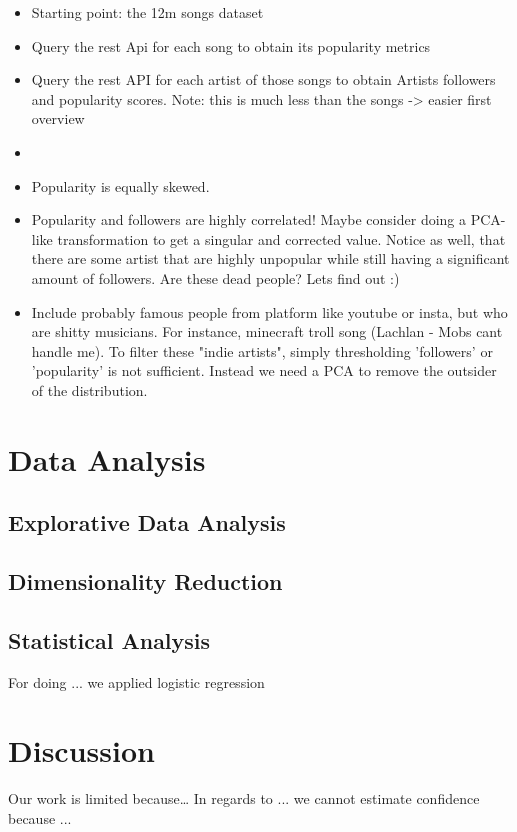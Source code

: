\documentclass{article}
\begin{document}
\begin{itemize}
  \item Starting point: the 12m songs dataset
  \item Query the rest Api for each song to obtain its popularity metrics
  \item Query the rest API for each artist of those songs to obtain Artists followers and popularity scores. Note: this is much less than the songs -> easier first overview
  \item 
  \item Popularity is equally skewed.
  \item Popularity and followers are highly correlated! Maybe consider doing a PCA-like transformation to get a singular and corrected value. Notice as well, that there are some artist that are highly unpopular while still having a significant amount of followers. Are these dead people? Lets find out :)
  \item Include probably famous people from platform like youtube or insta, but who are shitty musicians. For instance, minecraft troll song (Lachlan - Mobs cant handle me).
  To filter these "indie artists", simply thresholding 'followers' or 'popularity' is not sufficient. Instead we need a PCA to remove the outsider of the distribution.
\end{itemize}

\section{Data Analysis}

\subsection{Explorative Data Analysis}

\subsection{Dimensionality Reduction}

\subsection{Statistical Analysis}
For doing ... we applied logistic regression

\section{Discussion}
Our work is limited because\dots
In regards to ... we cannot estimate confidence because ...
\end{document}
